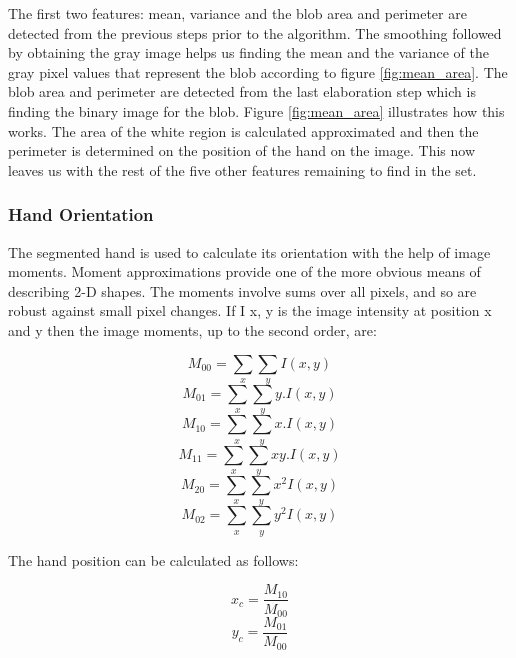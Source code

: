 \documentclass[12pt,fleqn]{book} %
\begin{document}
\bigskip
The first two features: mean, variance and the blob area and perimeter are detected from the previous steps prior to the algorithm. The smoothing followed by obtaining the gray image helps us finding the mean and the variance of the gray pixel values that represent the blob according to figure \ref{fig:mean_area}. The blob area and perimeter are detected from the last elaboration step which is finding the binary image for the blob. Figure \ref{fig:mean_area} illustrates how this works. The area of the white region is calculated approximated and then the perimeter is determined on the position of the hand on the image. This now leaves us with the rest of the five other features remaining to find in the set.
\bigskip
\subsubsection{Hand Orientation}
The segmented hand is used to calculate its orientation with the help of image moments. Moment approximations provide one of the more obvious means of describing 2-D shapes. The moments involve sums over all pixels, and so are robust against small pixel changes. If I x, y is the image intensity at position x and y then the image moments, up to the second order, are:
\bigskip
\begin{dBox}
\begin{equation}
	M_{00}= \sum_{x}\sum_{y}I(x,y)
\end{equation}
\begin{equation}
	M_{01}= \sum_{x}\sum_{y}y.I(x,y)
\end{equation}
\begin{equation}
	M_{10}= \sum_{x}\sum_{y}x.I(x,y)
\end{equation}
\begin{equation}
	M_{11}= \sum_{x}\sum_{y}xy.I(x,y)
\end{equation}
\begin{equation}
	M_{20}= \sum_{x}\sum_{y}x^{2}I(x,y)
\end{equation}
\begin{equation}
	M_{02}= \sum_{x}\sum_{y}y^{2}I(x,y)
\end{equation}
\end{dBox}
\bigskip
The hand position can be calculated as follows:
\bigskip
\begin{dBox}
\begin{equation}
	x_{c} = \frac{M_{10}}{M_{00}}
\end{equation}
\begin{equation}
	y_{c} = \frac{M_{01}}{M_{00}}
\end{equation}
\end{dBox}
\end{document}
